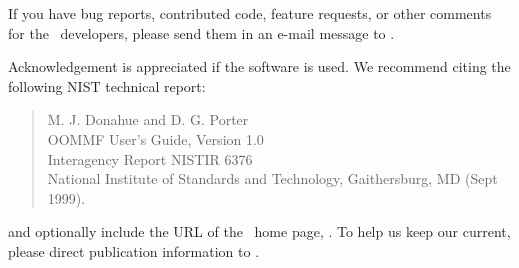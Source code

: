 If you have bug reports, contributed code, feature
requests, or other comments for the \OOMMF\ developers, please send them
in an e-mail message to {}%
.

Acknowledgement is appreciated if the software is used.  We recommend
citing the following NIST technical report:
\begin{quote}
M. J. Donahue and D. G. Porter\\
OOMMF User's Guide, Version 1.0\\
Interagency Report NISTIR 6376\\
National Institute of Standards and Technology, Gaithersburg, MD (Sept 1999).
\end{quote}
and optionally include the URL of the \OOMMF\ home page,
.
To help us keep our 
current, please direct publication
information to {}.

\htmlinfo*
